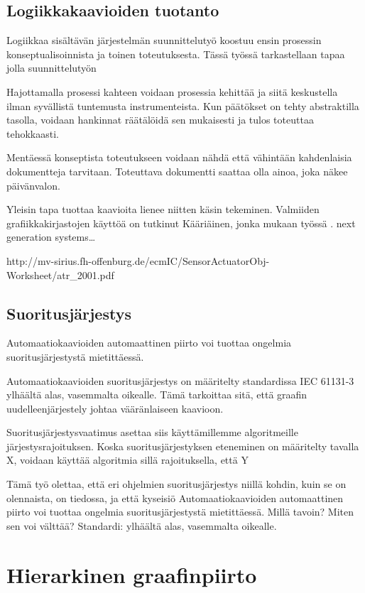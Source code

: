 \documentclass[finnish,12pt]{article}
\begin{document}
		\subsection{Logiikkakaavioiden tuotanto}

Logiikkaa sisältävän järjestelmän suunnittelutyö koostuu ensin prosessin konseptualisoinnista ja toinen toteutuksesta.
Tässä työssä tarkastellaan tapaa jolla suunnittelutyön 

Hajottamalla prosessi kahteen voidaan prosessia kehittää ja siitä keskustella ilman syvällistä tuntemusta instrumenteista.
Kun päätökset on tehty abstraktilla tasolla, voidaan hankinnat räätälöidä sen mukaisesti ja tulos toteuttaa tehokkaasti.

Mentäessä konseptista toteutukseen voidaan nähdä että vähintään kahdenlaisia dokumentteja tarvitaan.
Toteuttava dokumentti saattaa olla ainoa, joka näkee päivänvalon. 

Yleisin tapa tuottaa kaavioita lienee niitten käsin tekeminen.
Valmiiden grafiikkakirjastojen käyttöä on tutkinut Kääriäinen, jonka mukaan työssä .
next generation systems…

http://mv-sirius.fh-offenburg.de/ecmIC/SensorActuatorObj-Worksheet/atr_2001.pdf

		\subsection{Suoritusjärjestys}
	
Automaatiokaavioiden automaattinen piirto voi tuottaa ongelmia suoritusjärjestystä mietittäessä. 

Automaatiokaavioiden suoritusjärjestys on määritelty standardissa IEC 61131-3 ylhäältä alas, vasemmalta oikealle.
Tämä tarkoittaa sitä, että graafin uudelleenjärjestely johtaa vääränlaiseen kaavioon.

Suoritusjärjestysvaatimus asettaa siis käyttämillemme algoritmeille järjestysrajoituksen.
Koska suoritusjärjestyksen eteneminen on määritelty tavalla X, voidaan käyttää algoritmia sillä rajoituksella, että Y

Tämä työ olettaa, että eri ohjelmien suoritusjärjestys niillä kohdin, kuin se on olennaista, on tiedossa, ja että kyseisiö
Automaatiokaavioiden automaattinen piirto voi tuottaa ongelmia suoritusjärjestystä mietittäessä. 
Millä tavoin?
Miten sen voi välttää?
Standardi: ylhäältä alas, vasemmalta oikealle.



	\clearpage
	\section{Hierarkinen graafinpiirto}
\end{document}
